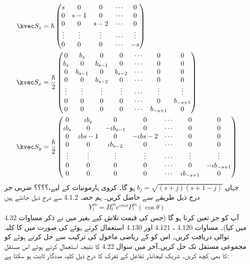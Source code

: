 \begin{align*}
    \kvec S_z&=\hslash \begin{pmatrix}
    s&0&0&\cdots&0\\0&s-1&0&\cdots&0\\0&0&s-2&\cdots&0\\\vdots&\vdots&\vdots&\cdots&\vdots\\0&0&0&\cdots&-s
    \end{pmatrix} \\ 
    \kvec S_x&=\frac{\hslash}{2}\begin{pmatrix}0&b_s&0&0&\cdots&0&0\\b_s&0&b_{s-1}&0&\cdots&0&0\\0&b_{s-1}&0&b_{s-2}&\cdots&0&0\\0&0&b_{s-2}&0&\cdots&0&0\\\vdots&\vdots&\vdots&\vdots&\cdots&\vdots&\vdots\\0&0&0&0&\cdots&0&b_{-s+1}\\0&0&0&0&\cdots&b_{-s+1}&0\end{pmatrix} \\
    \kvec S_y&=\frac{\hslash}{2}\begin{pmatrix}0&\iota b_s&0&0&\cdots&0&0\\\iota b_s&0&-\iota b_{s-1}&0&\cdots&0&0\\0&\iota b{s-1}&0&-\iota b{s-2}&\cdots&0&0\\0&0&\iota b_{s-2}&0&\cdots&0&0\\\vdots&\vdots&\vdots&\vdots&\cdots&\vdots&\vdots\\0&0&0&0&\cdots&0&-\iota b_{-s+1}\\0&0&0&0&\cdots&\iota b_{-s+1}&0
    \end{pmatrix}
\end{align*} 
جہاں \(b_j=\sqrt{(s+j)(s+1-j)}\) ہو گا۔
کروی ہارمونیات کے لیے،؟؟؟؟ ضربی جز درج ذیل طریقے سے حاصل کریں۔ ہم حصہ 4.1.2 سے درج ذیل جانتے ہیں 
\begin{align*} 
    Y_{l}^{m}=B_{    l}^{m}e^{\iota m\phi}P_{l}    ^{m}(\cos\theta)
\end{align*} 
آپ کو جز  تعین کرنا ہو گا (جس کی قیمت تلاش کیے بغیر میں نے ذکر مساوات 4.32 میں کیا)۔ مساوات 4.120 ، 4.121 اور 4.130 استعمال کرتے ہوئے  کی صورت میں  کا کلیہ توالی دریافت کریں۔ اس کو  کے ریاضی ماخول کی ترکیب سے حل کرتے ہوئے  کو مجموعی مستقل  تک حل کریں۔آخر میں سوال 4.22 کا نتیجہ استعمال کرتے ہوئے اس مستقل کا بھی کچھ کریں۔ شریک لیجانڈر تفاعل کے تفرک کا درج ذیل کلیہ مددگار ثابت ہو سکتا ہے:

